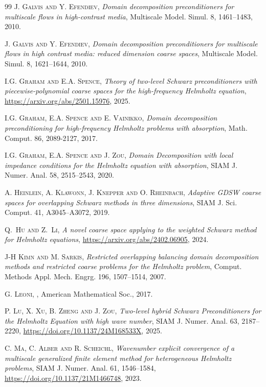 \documentclass[numbers,webpdf,imaiai]{ima-authoring-template}%
\theoremstyle{thmstyletwo}%
\numberwithin{equation}{section}
\numberwithin{equation}{section}
\begin{document}
{\begin{thebibliography}{99}
\textsc{J. Galvis and Y. Efendiev}, 
\textit{Domain decomposition preconditioners for multiscale flows in high-contrast media}, 
Multiscale Model. Simul. 8, 1461--1483, 2010.

\textsc{J. Galvis and Y. Efendiev}, 
\textit{Domain decomposition preconditioners for multiscale flows in high contrast media: reduced dimension coarse spaces}, 
Multiscale Model. Simul. 8, 1621--1644, 2010.

\textsc{I.G. Graham and E.A. Spence},
\textit{Theory of two-level Schwarz preconditioners with piecewise-polynomial coarse spaces 
for the high-frequency Helmholtz equation},
\url{https://arxiv.org/abs/2501.15976}, 2025.

\textsc{I.G. Graham, E.A. Spence and E. Vainikko}, 
\textit{Domain decomposition preconditioning for high-frequency Helmholtz problems with absorption}, 
Math. Comput. 86, 2089-2127, 2017.

\textsc{I.G. Graham, E.A. Spence and J. Zou}, 
\textit{Domain Decomposition with local impedance conditions for the Helmholtz equation with absorption}, 
SIAM J. Numer. Anal. 58, 2515--2543, 2020. 
  
\textsc{A. Heinlein, A. Klawonn, J.  Knepper and O. Rheinbach},
\textit{Adaptive GDSW coarse spaces for overlapping Schwarz methods in three dimensions},
SIAM J. Sci. Comput. 41, A3045--A3072, 2019.

\textsc{Q.~Hu and Z.~Li},
\textit{A novel coarse space applying to the weighted Schwarz method for Helmholtz equations},
\url{https://arxiv.org/abs/2402.06905}, 2024.

\textsc{J-H Kimn and M. Sarkis},
\textit{Restricted overlapping balancing domain decomposition methods and restricted coarse problems for the Helmholtz problem},
Comput. Methods Appl. Mech. Engrg. 196, 1507--1514, 2007.

\textsc{G. Leoni}, 
, 
American Mathematical Soc., 2017.

\textsc{P. Lu, X. Xu, B. Zheng and J. Zou},
\textit{Two-level hybrid Schwarz Preconditioners for the Helmholtz Equation with high wave number},
SIAM J. Numer. Anal. 63, 2187--2220, \url{https://doi.org/10.1137/24M168533X}, 2025.

\textsc{C. Ma, C. Alber and R. Scheichl},
\textit{Wavenumber explicit convergence of a multiscale generalized finite
element method for heterogeneous Helmholtz problems},
SIAM J. Numer. Anal. 61, 1546--1584, \url{https://doi.org/10.1137/21M1466748}, 2023.


\end{thebibliography}}
\end{document}
